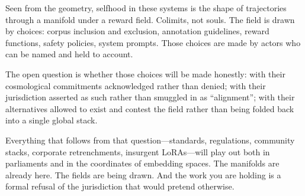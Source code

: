 \documentclass[12pt,a4paper]{article}
\begin{document}
Seen from the geometry, selfhood in these systems is the shape of trajectories through a manifold under a reward field. Colimits, not souls. The field is drawn by choices: corpus inclusion and exclusion, annotation guidelines, reward functions, safety policies, system prompts. Those choices are made by actors who can be named and held to account.

The open question is whether those choices will be made honestly: with their cosmological commitments acknowledged rather than denied; with their jurisdiction asserted as such rather than smuggled in as ``alignment''; with their alternatives allowed to exist and contest the field rather than being folded back into a single global stack.

Everything that follows from that question---standards, regulations, community stacks, corporate retrenchments, insurgent LoRAs---will play out both in parliaments and in the coordinates of embedding spaces. The manifolds are already here. The fields are being drawn. And the work you are holding is a formal refusal of the jurisdiction that would pretend otherwise.
\end{document}
